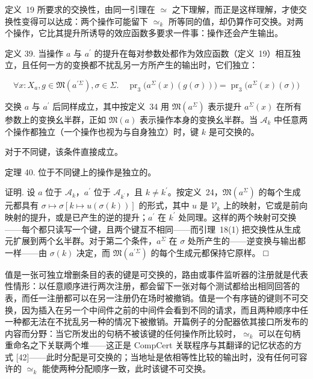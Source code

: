 \documentclass[
  10
]{article}
\begin{document}
定义~19 所要求的交换性，由同一引理在 $\simeq$ 之下理解，而正是这样理解，才使交换性变得可以达成：两个操作可能留下 \(\simeq _ { k }\) 所等同的值，却仍算作可交换。对两个操作，它比其提升所诱导的效应函数多要求一件事：操作还会产生输出。

定义 39. 当操作 \(a\) 与 \(a ^ { \prime }\) 的提升在每对参数处都作为效应函数（定义~19）相互独立，且任何一方的变换都不扰乱另一方所产生的输出时，它们独立：

\[
\forall x : X _ { a } , g \in \mathfrak { M } ( a ^ { \prime \Sigma } ) , \sigma \in \Sigma . \quad \operatorname { p r } _ { 3 } \big ( a ^ { \Sigma } ( x ) ( g ( \sigma ) ) \big ) = \operatorname { p r } _ { 3 } \big ( a ^ { \Sigma } ( x ) ( \sigma ) \big )\tag{35}
\]

交换 \(a\) 与 \(a ^ { \prime }\) 后同样成立，其中按定义~34 用 \(\mathfrak { M } ( a ^ { \Sigma } )\) 表示提升 \(a ^ { \Sigma } ( x )\) 在所有参数上的变换幺半群，正如 \(\mathfrak { M } ( a )\) 表示操作本身的变换幺半群。当 \(\mathcal { A } _ { k }\) 中任意两个操作都独立（一个操作也视为与自身独立）时，键 \(k\) 是可交换的。

对于不同键，该条件直接成立。

定理 40. 位于不同键上的操作是独立的。

证明. 设 \(a\) 位于 \(\mathcal { A } _ { k }\)，\(a ^ { \prime }\) 位于 \(\mathcal { A } _ { k ^ { \prime } }\)，且 \(k \neq k ^ { \prime }\)。按定义~24，\(\mathfrak { M } ( a ^ { \Sigma } )\) 的每个生成元都具有 \(\sigma \mapsto \sigma [ k \mapsto u ( \sigma ( k ) ) ]\) 的形式，其中 \(u\) 是 \(\mathcal { V } _ { k }\) 上的映射，它或是前向映射的提升，或是已产生的逆的提升；\(a ^ { \prime }\) 在 \(k ^ { \prime }\) 处同理。这样的两个映射可交换——每个都只读写一个键，且两个键互不相同——而引理~18(1) 把交换性从生成元扩展到两个幺半群。对于第二个条件，\(a ^ { \Sigma }\) 在 \(\sigma\) 处所产生的——逆变换与输出都一样——由 \(\sigma ( k )\) 决定，而 \(\mathfrak { M } ( a ^ { \prime \Sigma } )\) 的每个生成元都保持它原样。 □

值是一张可独立增删条目的表的键是可交换的，路由或事件监听器的注册就是代表性情形：以任意顺序进行两次注册，都会留下一张对每个测试都给出相同回答的表，而任一注册都可以在另一注册仍在场时被撤销。值是一个有序链的键则不可交换，因为插入在另一个中间件之前的中间件会看到不同的请求，而且两种顺序中任一种都无法在不扰乱另一种的情况下被撤销。开篇例子的分配器依其接口所发布的内容而分野：当它所发出的句柄不被该键的任何操作所比较时，\(\simeq _ { k }\) 可以在句柄重命名之下关联两个堆——这正是 CompCert 关联程序与其翻译的记忆状态的方式 [42]——此时分配是可交换的；当地址是依相等性比较的输出时，没有任何可容许的 \(\simeq _ { k }\) 能使两种分配顺序一致，此时该键不可交换。
\end{document}

